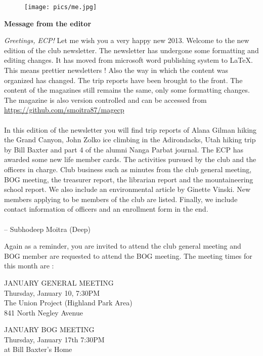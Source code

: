 \documentclass[10pt,a4paper]{article}
\newcommand{\NewsItem}[1]{%
		\usefont{T1}{augie}{m}{n} 	
		\large \bf #1 \vspace{4pt}
		\par \normalsize \normalfont}
\begin{document}
\begin{center}
\begin{minipage}[h]{0.8\linewidth}
	\begin{figure}
		\texttt{[image: pics/me.jpg]}
		\\%
	\end{figure}
	
	\NewsItem{Message from the editor}
	\emph{Greetings, ECP!} Let me wish you a very happy new 2013. Welcome to the new edition of the club newsletter. The newsletter has undergone some formatting and editing changes. It has moved from microsoft word publishing system to \LaTeX. This means prettier newsletters ! Also the way in which the content was organized has changed. The trip reports have been brought to the front. The content of the magazines still remains the same, only some formatting changes. The magazine is also version controlled and can be accessed from \url{https://github.com/smoitra87/magecp} 	
\\
\\
	In this edition of the newsletter you will find trip reports of Alana Gilman hiking the Grand Canyon, John Zolko ice climbing in the Adirondacks, Utah hiking trip by Bill Baxter and part 4 of the alumni Nanga Parbat journal. The ECP has awarded some new life member cards. The activities pursued by the club and the officers in charge. Club business such as minutes from the club general meeting, BOG meeting, the treasurer report, the librarian report and the mountaineering school report. We also include an environmental article by Ginette Vinski. New members applying to be members of the club are listed. Finally, we include contact information of officers and an enrollment form in the end. 
\\
\\
-- Subhodeep Moitra (Deep)

\vspace{0.5cm}

	Again as a reminder, you are invited to attend the club general meeting and BOG member are requested to attend the BOG meeting. The meeting times for this month are :
	
\vspace{1cm}

\begin{multicols}{2}
\Large
JANUARY GENERAL MEETING\\
Thursday, January 10, 7:30PM\\
The Union Project (Highland Park Area)\\
841 North Negley Avenue

JANUARY BOG MEETING\\
Thursday, January 17th 7:30PM\\
at Bill Baxter's Home



\normalsize
\end{multicols}
	
\end{minipage}
\end{center}
\end{document}
